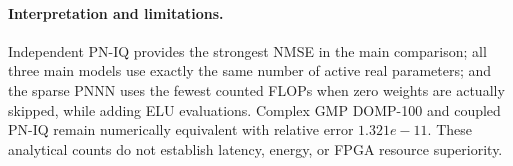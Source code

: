 \documentclass[10pt]{article}
\begin{document}
\paragraph{Interpretation and limitations.} Independent PN-IQ provides the strongest NMSE in the main comparison; all three main models use exactly the same number of active real parameters; and the sparse PNNN uses the fewest counted FLOPs when zero weights are actually skipped, while adding ELU evaluations. Complex GMP DOMP-100 and coupled PN-IQ remain numerically equivalent with relative error $1.321e-11$. These analytical counts do not establish latency, energy, or FPGA resource superiority.
\end{document}
